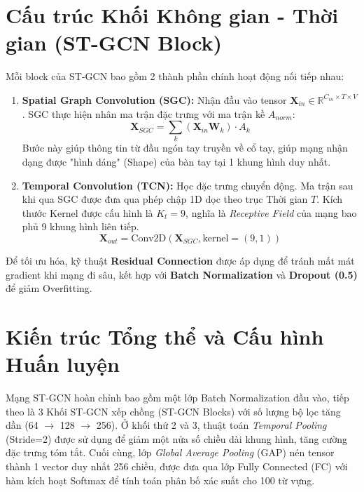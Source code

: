 \documentclass[a4paper,12pt]{report}
\begin{document}
\section{Cấu trúc Khối Không gian - Thời gian (ST-GCN Block)}
Mỗi block của ST-GCN bao gồm 2 thành phần chính hoạt động nối tiếp nhau:
\begin{enumerate}
    \item \textbf{Spatial Graph Convolution (SGC):}
    Nhận đầu vào tensor $\mathbf{X}_{in} \in \mathbb{R}^{C_{in} \times T \times V}$. SGC thực hiện nhân ma trận đặc trưng với ma trận kề $A_{norm}$:
    \begin{equation}
        \mathbf{X}_{SGC} = \sum_{k} ( \mathbf{X}_{in} \mathbf{W}_k ) \cdot A_{k}
    \end{equation}
    Bước này giúp thông tin từ đầu ngón tay truyền về cổ tay, giúp mạng nhận dạng được "hình dáng" (Shape) của bàn tay tại 1 khung hình duy nhất.
    
    \item \textbf{Temporal Convolution (TCN):}
    Học đặc trưng chuyển động. Ma trận sau khi qua SGC được đưa qua phép chập 1D dọc theo trục Thời gian $T$. Kích thước Kernel được cấu hình là $K_t = 9$, nghĩa là \textit{Receptive Field} của mạng bao phủ 9 khung hình liên tiếp.
    \begin{equation}
        \mathbf{X}_{out} = \text{Conv2D}(\mathbf{X}_{SGC}, \text{kernel}=(9, 1))
    \end{equation}
\end{enumerate}

Để tối ưu hóa, kỹ thuật \textbf{Residual Connection} được áp dụng để tránh mất mát gradient khi mạng đi sâu, kết hợp với \textbf{Batch Normalization} và \textbf{Dropout (0.5)} để giảm Overfitting.

\section{Kiến trúc Tổng thể và Cấu hình Huấn luyện}
Mạng ST-GCN hoàn chỉnh bao gồm một lớp Batch Normalization đầu vào, tiếp theo là 3 Khối ST-GCN xếp chồng (ST-GCN Blocks) với số lượng bộ lọc tăng dần (64 $\to$ 128 $\to$ 256). Ở khối thứ 2 và 3, thuật toán \textit{Temporal Pooling} (Stride=2) được sử dụng để giảm một nửa số chiều dài khung hình, tăng cường đặc trưng tóm tắt. Cuối cùng, lớp \textit{Global Average Pooling} (GAP) nén tensor thành 1 vector duy nhất 256 chiều, được đưa qua lớp Fully Connected (FC) với hàm kích hoạt Softmax để tính toán phân bố xác suất cho 100 từ vựng.
\end{document}
